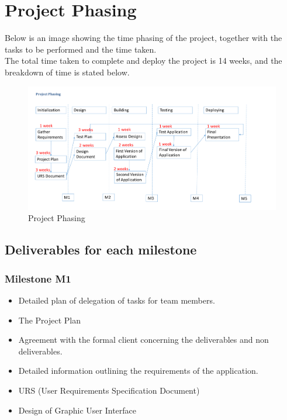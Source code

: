 \documentclass[a4paper,11pt]{article}
\begin{document}
      \section{Project Phasing}
      Below is an image showing the time phasing of the project, together with the tasks to be performed and the time taken.\\
      The total time taken to complete and deploy the project is 14 weeks, and the breakdown of time is stated below.
      \begin{figure}[h]
      	\centering
      	\includegraphics[width=\textwidth]{figures/projectPhasing.pdf}
      	\caption{Project Phasing}
      	\label{fig:pp}
      	\end{figure}
      	
      	\subsection{Deliverables for each milestone}
      	\subsubsection{Milestone M1}
      	  \begin{itemize}
      	  	\item Detailed plan of delegation of tasks for team members.
      	  	\item The Project Plan
      	  	\item Agreement with the formal client concerning the deliverables and non deliverables.
      	  	\item Detailed information outlining the requirements of the application.
      	  	\item URS (User Requirements Specification Document)
      	  	\item Design of Graphic User Interface
      	  	
      	  \end{itemize}
      	  
\end{document}
